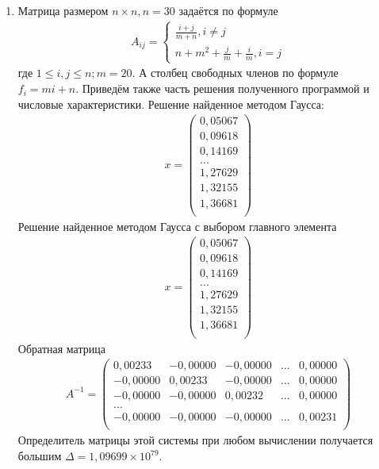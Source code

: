 \documentclass[a4paper,12pt,titlepage,finall]{article}
\begin{document}
\begin{enumerate}
\item
Матрица размером $n \times n, n = 30$ задаётся по формуле
\begin{align}
A_{ij} = \left\{
\begin{array}{ll}
\frac{i+j}{m+n}, i \neq j\\
n + m^2 + \frac{j}{m} + \frac{i}{m}, i = j
\end{array}
\right.
\end{align}
где $1 \leq i,j \leq n; m = 20$. А столбец свободных членов по формуле $f_i = mi + n$. Приведём также часть решения полученного программой и числовые характеристики.
Решение найденное методом Гаусса:
\begin{align*}
x = \begin{pmatrix}
0,05067 \\
   0,09618 \\
   0,14169 \\
   ...\\
   1,27629 \\
   1,32155 \\
   1,36681 \\
\end{pmatrix}
\end{align*}
Решение найденное методом Гаусса с выбором главного элемента
\begin{align*}
x = \begin{pmatrix}
  0,05067 \\
   0,09618 \\
   0,14169 \\
   ...\\
   1,27629 \\
   1,32155 \\
   1,36681 \\
\end{pmatrix}
\end{align*}
Обратная матрица
\begin{align*}
A^{-1} = \begin{pmatrix}
    0,00233&    -0,00000&    -0,00000& ... &0,00000\\
   -0,00000&     0,00233&    -0,00000& ... &0,00000\\
   -0,00000&    -0,00000&     0,00232& ... &0,00000\\
   ...\\
   -0,00000&    -0,00000&    -0,00000& ... &0,00231\\
\end{pmatrix}
\end{align*}
Определитель матрицы этой системы при любом вычислении получается большим $\Delta = 1,09699 \times 10^{79}$.\\

\end{enumerate}
\end{document}
